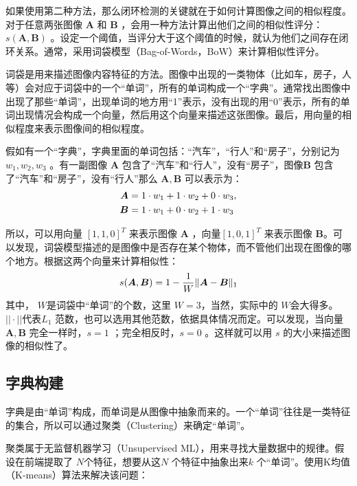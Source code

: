 如果使用第二种方法，那么闭环检测的关键就在于如何计算图像之间的相似程度。对于任意两张图像 $\bm{A} $ 和 $\bm{B} $ ，会用一种方法计算出他们之间的相似性评分：$s(\bm{A}, \bm{B}) $ 。设定一个阈值，当评分大于这个阈值的时候，就认为他们之间存在闭环关系。通常，采用词袋模型（Bag-of-Words，BoW）来计算相似性评分。

词袋是用来描述图像内容特征的方法。图像中出现的一类物体（比如车，房子，人等）会对应于词袋中的一个“单词”，所有的单词构成一个“字典”。通常找出图像中出现了那些“单词”，出现单词的地方用“1”表示，没有出现的用“0”表示，所有的单词出现情况会构成一个向量，然后用这个向量来描述这张图像。最后，用向量的相似程度来表示图像间的相似程度。

假如有一个“字典”，字典里面的单词包括：“汽车”，“行人”和“房子”，分别记为$w_1,w_2,w_3 $ 。有一副图像 $\bm{A} $ 包含了“汽车”和“行人”，没有“房子”，图像$\bm{B} $ 包含了“汽车”和“房子”，没有“行人”那么 $\bm{A},\bm{B} $ 可以表示为：
\begin{equation}
\label{eqn:4.27}
\setlength{\abovedisplayskip}{6pt}
\setlength{\belowdisplayskip}{6pt}
\begin{aligned}
\bm{A}&=1 \cdot w_{1}+1 \cdot w_{2}+0 \cdot w_{3}, \\
\bm{B}&=1 \cdot w_{1}+0 \cdot w_{2}+1 \cdot w_{3}
\end{aligned}
\end{equation}

所以，可以用向量 $[1,1,0]^{T} $ 来表示图像 $\bm{A} $ ，向量$[1,0,1]^{T} $ 来表示图像 $\bm{B} $。可以发现，词袋模型描述的是图像中是否存在某个物体，而不管他们出现在图像的哪个地方。根据这两个向量来计算相似性：
\begin{equation}
\label{eqn:4.28}
\setlength{\abovedisplayskip}{6pt}
\setlength{\belowdisplayskip}{6pt}
s(\boldsymbol{A}, \boldsymbol{B})=1-\frac{1}{W}\|\boldsymbol{A}-\boldsymbol{B}\|_{1}
\end{equation}
其中， $W $是词袋中“单词”的个数，这里 $W =3$，当然，实际中的 $W $会大得多。 $||\cdot || $代表$L_1 $ 范数，也可以选用其他范数，依据具体情况而定。可以发现，当向量 $\bm{A},\bm{B} $ 完全一样时，$s=1$ ；完全相反时，$s=0$ 。这样就可以用 $s$ 的大小来描述图像的相似性了。
\subsection{字典构建}
字典是由“单词”构成，而单词是从图像中抽象而来的。一个“单词”往往是一类特征的集合，所以可以通过聚类（Clustering）来确定“单词”。

聚类属于无监督机器学习（Unsupervised ML），用来寻找大量数据中的规律。假设在前端提取了 $N$个特征，想要从这$N$ 个特征中抽象出来$k$ 个“单词”。使用K均值（K-means）算法来解决该问题：

